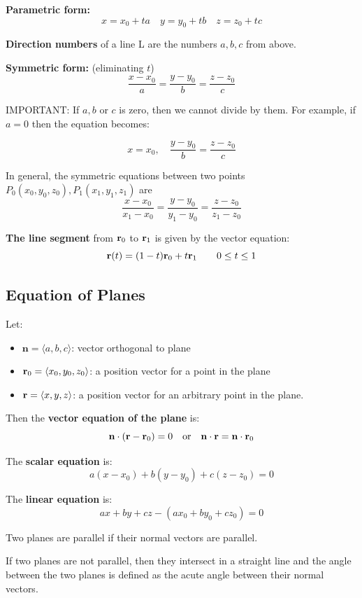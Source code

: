 \documentclass{report}
\begin{document}
\textbf{Parametric form:}
\[
x = x_0 + t a \quad y = y_0 + t b \quad z = z_0 + t c
\]

\textbf{Direction numbers} of a line L are the numbers $a, b, c$ from above. 

\textbf{Symmetric form:} (eliminating $t$) 
\[
\frac{x - x_0}{a} = \frac{y - y_0}{b} = \frac{z - z_0}{c}
\]

IMPORTANT: If $a, b$ or $c$ is zero, then we cannot divide by them.
For example, if $a = 0$ then the equation becomes:

\[
x = x_0, \quad \frac{y - y_0}{b} = \frac{z - z_0}{c}
\]

In general, the symmetric equations between two points $P_0(x_0, y_0, z_0), P_1(x_1, y_1, z_1)$ are 
\[
\frac{x - x_0}{x_1 - x_0} = \frac{y - y_0}{y_1 - y_0} = \frac{z - z_0}{z_1 - z_0}
\]

\textbf{The line segment} from $\mathbf{r}_0$ to $\mathbf{r}_1$ is given by the vector equation:
\[
\mathbf{r}(t) = (1 - t)\mathbf{r}_0 + t \mathbf{r}_1 \quad \quad 0 \le t \le 1
\]

\subsection{Equation of Planes}

Let: 
\begin{itemize}
    \item $\mathbf{n} = \langle a, b, c \rangle$: vector orthogonal to plane
    \item $\mathbf{r}_0 = \langle x_0, y_0, z_0 \rangle$: a position vector for a point in the plane 
    \item $\mathbf{r} = \langle x, y, z \rangle$: a position vector for an arbitrary point in the plane.
\end{itemize}

Then the \textbf{vector equation of the plane} is: 
\[
\mathbf{n} \cdot (\mathbf{r} - \mathbf{r}_0) = 0 \quad \text{or} \quad \mathbf{n} \cdot \mathbf{r} = \mathbf{n} \cdot \mathbf{r}_0
\]

The \textbf{scalar equation} is:
\[
a(x - x_0) + b(y - y_0) + c(z - z_0) = 0
\]

The \textbf{linear equation} is:
\[
ax + by + cz - (a x_0 + b y_0 + c z_0) = 0
\] 

Two planes are parallel if their normal vectors are parallel.

If two planes are not parallel, then they intersect in a straight line and the angle between the two planes 
is defined as the acute angle between their normal vectors.
\end{document}
